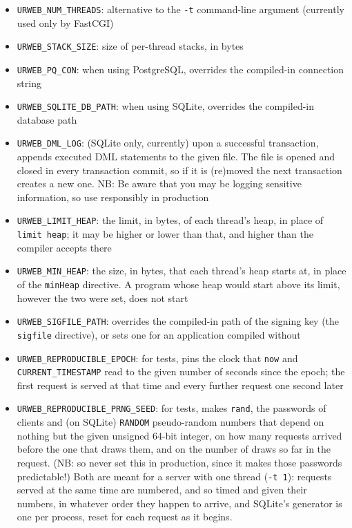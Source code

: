 \documentclass{article}
\newcommand{\cd}[1]{\texttt{#1}}
\begin{document}
\begin{itemize}
  \item \cd{URWEB\_NUM\_THREADS}: alternative to the \cd{-t} command-line argument (currently used only by FastCGI)
  \item \cd{URWEB\_STACK\_SIZE}: size of per-thread stacks, in bytes
  \item \cd{URWEB\_PQ\_CON}: when using PostgreSQL, overrides the compiled-in connection string
  \item \cd{URWEB\_SQLITE\_DB\_PATH}: when using SQLite, overrides the compiled-in database path
  \item \cd{URWEB\_DML\_LOG}: (SQLite only, currently) upon a successful transaction, appends executed DML statements to the given file. The file is opened and closed in every transaction commit, so if it is (re)moved the next transaction creates a new one. NB: Be aware that you may be logging sensitive information, so use responsibly in production
  \item \cd{URWEB\_LIMIT\_HEAP}: the limit, in bytes, of each thread's heap, in place of \texttt{limit heap}; it may be higher or lower than that, and higher than the compiler accepts there
  \item \cd{URWEB\_MIN\_HEAP}: the size, in bytes, that each thread's heap starts at, in place of the \texttt{minHeap} directive.  A program whose heap would start above its limit, however the two were set, does not start
  \item \cd{URWEB\_SIGFILE\_PATH}: overrides the compiled-in path of the signing key (the \texttt{sigfile} directive), or sets one for an application compiled without
  \item \cd{URWEB\_REPRODUCIBLE\_EPOCH}: for tests, pins the clock that \cd{now} and \cd{CURRENT\_TIMESTAMP} read to the given number of seconds since the epoch; the first request is served at that time and every further request one second later
  \item \cd{URWEB\_REPRODUCIBLE\_PRNG\_SEED}: for tests, makes \cd{rand}, the passwords of clients and (on SQLite) \cd{RANDOM} pseudo-random numbers that depend on nothing but the given unsigned 64-bit integer, on how many requests arrived before the one that draws them, and on the number of draws so far in the request. (NB: so never set this in production, since it makes those passwords predictable!)
  Both are meant for a server with one thread (\texttt{-t 1}): requests served at the same time are numbered, and so timed and given their numbers, in whatever order they happen to arrive, and SQLite's generator is one per process, reset for each request as it begins.
\end{itemize}
\end{document}
